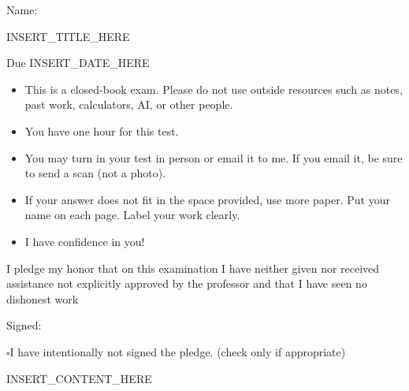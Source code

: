 \documentclass[12pt]{article}
\newcommand{\testrules}{
\begin{itemize}
  \item This is a closed-book exam. Please do not use outside resources such as notes, past work, calculators, AI, or other people. 
  \item You have one hour for this test.
  \item You may turn in your test in person or email it to me. If you email it, be sure to send a scan (not a photo).
  \item If your answer does not fit in the space provided, use more paper. Put your name on each page. Label your work clearly. 
  \item I have confidence in you!
\end{itemize}
}
\newcommand{\pledge}{
I pledge my honor that on this examination I have neither given nor received assistance not explicitly approved by the professor and that I have seen no dishonest work 

\hfill Signed: \makebox[3in]{\hrulefill}

$\square$\quad I have intentionally not signed the pledge. (check only if appropriate)
}
\begin{document}
Name: \makebox[3in]{\hrulefill
\hrulefill}

\vfill

\begin{center}
{\huge INSERT_TITLE_HERE}

{\large Due INSERT_DATE_HERE}
\end{center}

\testrules

\vfill

\pledge

\newpage

INSERT_CONTENT_HERE
\end{document}
